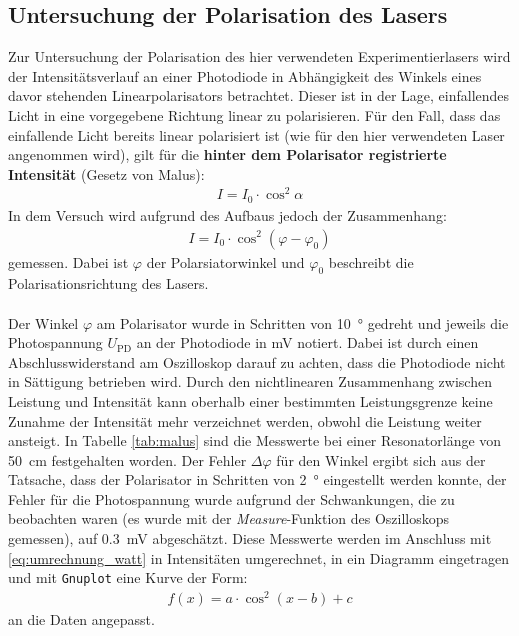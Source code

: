 \documentclass[11pt, a4paper]{article}
\numberwithin{equation}{section}
\begin{document}
\subsection{Untersuchung der Polarisation des Lasers}
\label{ssec:polarisation}
Zur Untersuchung der Polarisation des hier verwendeten Experimentierlasers wird der Intensitätsverlauf an einer Photodiode in Abhängigkeit des Winkels eines davor stehenden Linearpolarisators betrachtet.
Dieser ist in der Lage, einfallendes Licht in eine vorgegebene Richtung linear zu polarisieren.
Für den Fall, dass das einfallende Licht bereits linear polarisiert ist (wie für den hier verwendeten Laser angenommen wird), gilt für die \textbf{hinter dem Polarisator registrierte Intensität} (Gesetz von Malus):
\begin{align}
I=I_0\cdot\cos^2\alpha
\end{align}
In dem Versuch wird aufgrund des Aufbaus jedoch der Zusammenhang:
\begin{align}
	I = I_0 \cdot \cos^2 (\varphi - \varphi_0)
\end{align}
gemessen.
Dabei ist $\varphi$ der Polarsiatorwinkel und $\varphi_0$ beschreibt die Polarisationsrichtung des Lasers.\\ 
\\
Der Winkel $\varphi$ am Polarisator wurde in Schritten von \SI{10}{\degree} gedreht und jeweils die Photospannung $U_\text{PD}$ an der Photodiode in \si{\milli\volt} notiert.
Dabei ist durch einen Abschlusswiderstand am Oszilloskop darauf zu achten, dass die Photodiode nicht in Sättigung betrieben wird.
Durch den nichtlinearen Zusammenhang zwischen Leistung und Intensität kann oberhalb einer bestimmten Leistungsgrenze keine Zunahme der Intensität mehr verzeichnet werden, obwohl die Leistung weiter ansteigt.
In Tabelle \ref{tab:malus} sind die Messwerte bei einer Resonatorlänge von \SI{50}{\centi\metre} festgehalten worden.
Der Fehler $\Delta\varphi$ für den Winkel ergibt sich aus der Tatsache, dass der Polarisator in Schritten von \SI{2}{\degree} eingestellt werden konnte, der Fehler für die Photospannung wurde aufgrund der Schwankungen, die zu beobachten waren (es wurde mit der \emph{Measure}-Funktion des Oszilloskops gemessen), auf \SI{0.3}{\milli\volt} abgeschätzt.
Diese Messwerte werden im Anschluss mit \eqref{eq:umrechnung_watt} in Intensitäten umgerechnet, in ein Diagramm eingetragen und mit \texttt{Gnuplot} eine Kurve der Form:
\begin{align}
f(x) = a\cdot\cos^2(x-b) + c
\end{align}
an die Daten angepasst.
\end{document}

